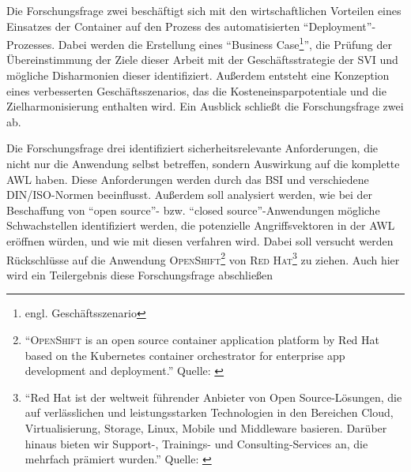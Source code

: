 Die Forschungsfrage zwei beschäftigt sich mit den wirtschaftlichen Vorteilen eines Einsatzes der Container auf den Prozess des automatisierten \enquote{Deployment}-Prozesses. Dabei werden die Erstellung eines \enquote{Business Case\footnote{engl. Geschäftsszenario}}, die Prüfung der Übereinstimmung der Ziele dieser Arbeit mit der Geschäftsstrategie der \ac{SVI} und mögliche Disharmonien dieser identifiziert. Außerdem entsteht eine Konzeption eines verbesserten Geschäftsszenarios, das die Kosteneinsparpotentiale und die Zielharmonisierung enthalten wird. Ein Ausblick schließt die Forschungsfrage zwei ab. 
\par
Die Forschungsfrage drei identifiziert sicherheitsrelevante Anforderungen, die nicht nur die Anwendung selbst betreffen, sondern Auswirkung auf die komplette \ac{AWL} haben. Diese Anforderungen werden durch das \acl{BSI} und verschiedene \textsc{DIN/ISO}-Normen beeinflusst. Außerdem soll analysiert werden, wie bei der Beschaffung von \enquote{open source}- bzw. \enquote{closed source}-Anwendungen mögliche Schwachstellen identifiziert werden, die potenzielle Angriffsvektoren in der \ac{AWL} eröffnen würden, und wie mit diesen verfahren wird. Dabei soll versucht werden Rückschlüsse auf die Anwendung \textsc{OpenShift\footnote{\enquote{\textsc{OpenShift} is an open source container application platform by Red Hat based on the Kubernetes container orchestrator for enterprise app development and deployment.} Quelle: \cite[][]{red_hat_inc_openshift_2020}}} von \textsc{Red Hat\footnote{\enquote{Red Hat ist der weltweit führender Anbieter von Open Source-Lösungen, die auf verlässlichen und leistungsstarken Technologien in den Bereichen Cloud, Virtualisierung, Storage, Linux, Mobile und Middleware basieren. Darüber hinaus bieten wir Support-, Trainings- und Consulting-Services an, die mehrfach prämiert wurden.} Quelle: \cite[][]{red_hat_inc_red_2020}}} zu ziehen. Auch hier wird ein Teilergebnis diese Forschungsfrage abschließen


